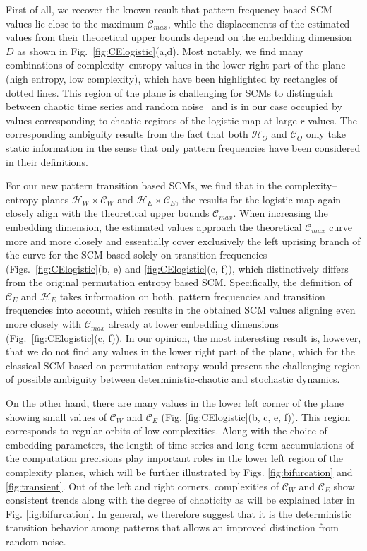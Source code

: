\documentclass[aip,cha,reprint,nofootinbib]{revtex4-1}
\begin{document}
First of all, we recover the known result that pattern frequency based SCM values lie close to the maximum $\mathcal{C}_{max}$, while the displacements of the estimated values from their theoretical upper bounds depend on the embedding dimension $D$ as shown in Fig.~\ref{fig:CElogistic}(a,d). Most notably, we find many combinations of complexity--entropy values in the lower right part of the plane (high entropy, low complexity), which have been highlighted by rectangles of dotted lines. This region of the plane is challenging for SCMs to distinguish between chaotic time series and random noise~\cite{BorgesAMC2019} and is in our case occupied by values corresponding to chaotic regimes of the logistic map at large $r$ values. The corresponding ambiguity results from the fact that both $\mathcal{H}_O$ and $\mathcal{C}_O$ only take static information in the sense that only pattern frequencies have been considered in their definitions. 

For our new pattern transition based SCMs, we find that in the complexity--entropy planes $\mathcal{H}_W \times \mathcal{C}_W$ and $\mathcal{H}_E \times \mathcal{C}_E$, the results for the logistic map again closely align with the theoretical upper bounds $\mathcal{C}_{max}$. When increasing the embedding dimension, the estimated values approach the theoretical $\mathcal{C}_{max}$ curve more and more closely and essentially cover exclusively the left uprising branch of the curve for the SCM based solely on transition frequencies (Figs.~\ref{fig:CElogistic}(b, e) and \ref{fig:CElogistic}(c, f)), which distinctively differs from the original permutation entropy based SCM. Specifically, the definition of $\mathcal{C}_{E}$ and $\mathcal{H}_{E}$ takes information on both, pattern frequencies and transition frequencies into account, which results in the obtained SCM values aligning even more closely with $\mathcal{C}_{max}$ already at lower embedding dimensions (Fig.~\ref{fig:CElogistic}(c, f)). In our opinion, the most interesting result is, however, that we do not find any values in the lower right part of the plane, which for the classical SCM based on permutation entropy would present the challenging region of possible ambiguity between deterministic-chaotic and stochastic dynamics. 

{\color{red}On the other hand, there are many values in the lower left corner of the plane showing small values of $\mathcal{C}_{W}$ and $\mathcal{C}_{E}$ (Fig. \ref{fig:CElogistic}(b, c, e, f)). This region corresponds to regular orbits of low complexities. Along with the choice of embedding parameters, the length of time series and long term accumulations of the computation precisions play important roles in the lower left region of the complexity planes, which will be further illustrated by Figs. \ref{fig:bifurcation} and \ref{fig:transient}. Out of the left and right corners, complexities of $\mathcal{C}_{W}$ and $\mathcal{C}_{E}$ show consistent trends along with the degree of chaoticity as will be explained later in Fig. \ref{fig:bifurcation}. } In general, we therefore suggest that it is the deterministic transition behavior among patterns that allows an improved distinction from random noise. 
\end{document}
